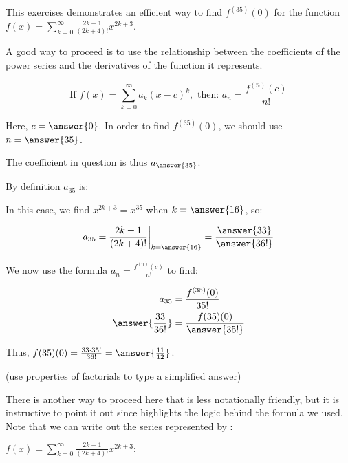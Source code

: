 \documentclass{ximera}
\author{Jim Talamo}
\begin{document}
\begin{exercise}
This exercises demonstrates an efficient way to find $f^{(35)}(0)$ for the function $f(x) = \sum_{k=0}^{\infty} \frac{2k+1}{(2k+4)!}x^{2k+3}$.  

A good way to proceed is to use the relationship between the coefficients of the power series and the derivatives of the function it represents.

\[
\textrm{If } f(x) = \sum_{k=0}^{\infty} a_k(x-c)^k, \textrm{ then: } a_n = \frac{f^{(n)}(c)}{n!}
\]

Here, $c=\answer{0}$.  In order to find $f^{(35)}(0)$, we should use $n=\answer{35}$.

The coefficient in question is thus $a_{\answer{35}}$.  

\begin{exercise}
By definition $a_{35}$ is:

\begin{multipleChoice}
\end{multipleChoice}

In this case, we find $x^{2k+3}=x^{35}$ when $k=\answer{16}$, so:

\[
a_{35} =  \frac{2k+1}{(2k+4)!} \bigg|_{k=\answer{16}} = \frac{\answer{33}}{\answer{36!}}
\]

\begin{exercise}
We now use the formula $a_n = \frac{f^{(n)}(c)}{n!}$ to find:

\begin{align*}
a_{35} &= \frac{f^{(35)}(0)}{35!} \\
\answer{\frac{33}{36!}} &= \frac{f{(35)}(0)}{\answer{35!}}
\end{align*}

\begin{exercise}
Thus, $f{(35)}(0) = \frac{33 \cdot 35!}{36!} = \answer{\frac{11}{12}}$.

(use properties of factorials to type a simplified answer)

\begin{exercise}
There is another way to proceed here that is less notationally friendly, but it is instructive to point it out since highlights the logic behind the formula we used.  Note that we can write out the series represented by :

$f(x) = \sum_{k=0}^{\infty} \frac{2k+1}{(2k+4)!}x^{2k+3}:$

\begin{image}
  \end{image}


\end{exercise}
\end{exercise}
\end{exercise}
\end{exercise}
\end{exercise}
\end{document}
